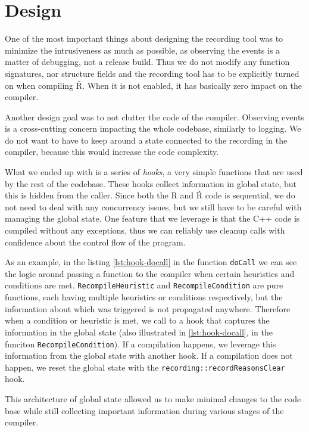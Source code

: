 \section{Design}

One of the most important things about designing the recording tool was to minimize the intrusiveness as much as possible, as observing the events is a matter of debugging, not a release build. Thus we do not modify any function signatures, nor structure fields and the recording tool has to be explicitly turned on when compiling Ř. When it is not enabled, it has basically zero impact on the compiler.

Another design goal was to not clutter the code of the compiler. Observing events is a cross-cutting concern impacting the whole codebase, similarly to logging. We do not want to have to keep around a state connected to the recording in the compiler, because this would increase the code complexity.

What we ended up with is a series of \textit{hooks}, a very simple functions that are used by the rest of the codebase. These hooks collect information in global state, but this is hidden from the caller. Since both the R and Ř code is sequential, we do not need to deal with any concurrency issues, but we still have to be careful with managing the global state. One feature that we leverage is that the C++ code is compiled without any exceptions, thus we can reliably use cleanup calls with confidence about the control flow of the program.

As an example, in the listing \ref{lst:hook-docall} in the function \texttt{doCall} we can see the logic around passing a function to the compiler when certain heuristics and conditions are met. \texttt{RecompileHeuristic} and \texttt{RecompileCondition} are pure functions, each having multiple heuristics or conditions respectively, but the information about which was triggered is not propagated anywhere. Therefore when a condition or heuristic is met, we call to a hook that captures the information in the global state (also illustrated in \ref{lst:hook-docall}, in the funciton \texttt{RecompileCondition}). If a compilation happens, we leverage this information from the global state with another hook. If a compilation does not happen, we reset the global state with the \texttt{recording::recordReasonsClear} hook.

This architecture of global state allowed us to make minimal changes to the code base while still collecting important information during various stages of the compiler.

